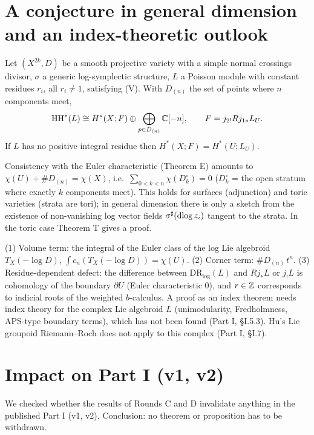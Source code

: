 \section{A conjecture in general dimension and an index-theoretic outlook}\label{p2:sec:conj}
\begin{conj}\tK\label{p2:conj:gen}
Let $(X^{2k},D)$ be a smooth projective variety with a simple normal crossings divisor, $\sigma$ a generic log-symplectic structure, $L$ a Poisson module with constant residues $r_i$, all $r_i\ne1$, satisfying (V). With $D_{(n)}$ the set of points where $n$ components meet,
\[\mathrm{HH}^*(L)\cong H^*(X;F)\oplus\bigoplus_{p\in D_{(n)}}\mathbb C[-n],\qquad F=j_{2!}Rj_{1*}L_U.\]
If $L$ has no positive integral residue then $H^*(X;F)=H^*(U;L_U)$.
\end{conj}
Consistency with the Euler characteristic (Theorem E) amounts to $\chi(U)+\#D_{(n)}=\chi(X)$, i.e.\ $\sum_{0<k<n}\chi(D_k^\circ)=0$ ($D_k^\circ$ = the open stratum where exactly $k$ components meet). This holds for surfaces (adjunction) and toric varieties (strata are tori)\tP; in general dimension there is only a sketch from the existence of non-vanishing log vector fields $\sigma^\sharp(\mathrm{dlog}\, z_i)$ tangent to the strata\tK. In the toric case Theorem T gives a proof.

\begin{obs}
(1) Volume term: the integral of the Euler class of the log Lie algebroid $T_X(-\log D)$, $\int c_n(T_X(-\log D))=\chi(U)$. (2) Corner term: $\#D_{(n)}\,t^n$. (3) Residue-dependent defect: the difference between $\mathrm{DR}_{\log}(L)$ and $Rj_*L$ or $j_!L$ is cohomology of the boundary $\partial U$ (Euler characteristic $0$), and $r\in\mathbb Z$ corresponds to indicial roots of the weighted $b$-calculus. A proof as an index theorem needs index theory for the complex Lie algebroid $L$ (unimodularity, Fredholmness, APS-type boundary terms), which has not been found (Part I, \S I.5.3). Hu's Lie groupoid Riemann--Roch does not apply to this complex (Part I, \S I.7).
\end{obs}

\section{Impact on Part I (v1, v2)}\label{p2:sec:chk}
We checked whether the results of Rounds C and D invalidate anything in the published Part I (v1, v2). Conclusion: no theorem or proposition has to be withdrawn.

